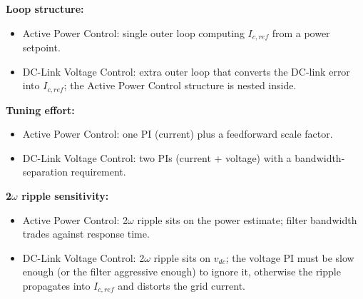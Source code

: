 \documentclass[11pt]{article}
\providecommand{\tightlist}{%
      \setlength{\itemsep}{0pt}\setlength{\parskip}{0pt}}
\begin{document}
\textbf{Loop structure:}
\begin{itemize}
\tightlist
\item Active Power Control: single outer loop computing \(I_{c,ref}\)
  from a power setpoint.
\item DC-Link Voltage Control: extra outer loop that converts the
  DC-link error into \(I_{c,ref}\); the Active Power Control structure
  is nested inside.
\end{itemize}

\textbf{Tuning effort:}
\begin{itemize}
\tightlist
\item Active Power Control: one PI (current) plus a feedforward scale
  factor.
\item DC-Link Voltage Control: two PIs (current + voltage) with a
  bandwidth-separation requirement.
\end{itemize}

\textbf{2\(\omega\) ripple sensitivity:}
\begin{itemize}
\tightlist
\item Active Power Control: 2\(\omega\) ripple sits on the power
  estimate; filter bandwidth trades against response time.
\item DC-Link Voltage Control: 2\(\omega\) ripple sits on
  \(v_{dc}\); the voltage PI must be slow enough (or the filter
  aggressive enough) to ignore it, otherwise the ripple propagates
  into \(I_{c,ref}\) and distorts the grid current.
\end{itemize}
\end{document}
